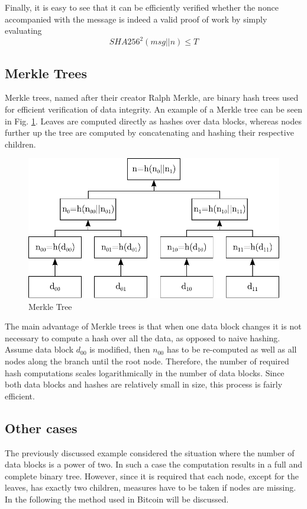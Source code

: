 \noindent
Finally, it is easy to see that it can be efficiently verified whether the nonce accompanied with the message is indeed a valid proof of work by simply evaluating
\begin{equation}
SHA256^{2}(msg||n) \leq T
\end{equation}

\clearpage
\subsection{Merkle Trees} \label{sec:MerkleTrees}
Merkle trees, named after their creator Ralph Merkle, are binary hash trees used for efficient verification of data integrity. An example of a Merkle tree can be seen in Fig. \ref{fig:MerkleTree}. Leaves are computed directly as hashes over data blocks, whereas nodes further up the tree are computed by concatenating and hashing their respective children.

\begin{figure}[htbp]
 \centering
 \includegraphics[scale=0.85]{Images/MerkleTree.pdf}
 \caption{Merkle Tree}
 \label{fig:MerkleTree}
\end{figure}
\vspace{-10pt}

\noindent
The main advantage of Merkle trees is that when one data block changes it is not necessary to compute a hash over all the data, as opposed to naive hashing. Assume data block $\mathit{d_{00}}$ is modified, then $\mathit{n_{00}}$ has to be re-computed as well as all nodes along the branch until the root node. Therefore, the number of required hash computations scales logarithmically in the number of data blocks. Since both data blocks and hashes are relatively small in size, this process is fairly efficient.

\subsection*{Other cases}
The previously discussed example considered the situation where the number of data blocks is a power of two. In such a case the computation results in a full and complete binary tree. However, since it is required that each node, except for the leaves, has exactly two children, measures have to be taken if nodes are missing. In the following the method used in Bitcoin will be discussed.~\\

